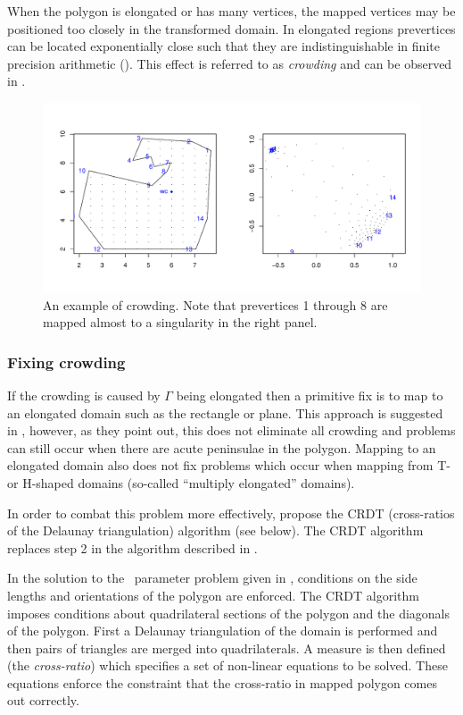 When the polygon is elongated or has many vertices, the mapped vertices may be positioned too closely in the transformed domain. In elongated regions prevertices can be located exponentially close such that they are indistinguishable in finite precision arithmetic (\cite{howell90}). This effect is referred to as \emph{crowding} and can be observed in . 

\begin{figure} [tbp]
\centering
\includegraphics[scale=0.5]{sc/figs/crowdeddisk.pdf}
\caption{An example of crowding. Note that prevertices 1 through 8 are mapped almost to a singularity in the right panel.}
\label{crowdeddisk}
\end{figure}

\subsubsection{Fixing crowding}
\label{sc-crdt}

If the crowding is caused by $\Gamma$ being elongated then a  primitive fix is to map to an elongated domain such as the rectangle or plane. This approach is suggested in , however, as they point out, this does not eliminate all crowding and problems can still occur when there are acute peninsulae in the polygon. Mapping to an elongated domain also does not fix problems which occur when mapping from T- or H-shaped domains (so-called ``multiply elongated'' domains).

In order to combat this problem more effectively,  propose the CRDT (cross-ratios of the Delaunay triangulation) algorithm (see below). The CRDT algorithm replaces step 2 in the algorithm described in . 

In the solution to the \sch\ parameter problem given in , conditions on the side lengths and orientations of the polygon are enforced. The CRDT algorithm imposes conditions about quadrilateral sections of the polygon and the diagonals of the polygon. First a Delaunay triangulation of the domain is performed and then pairs of triangles are merged into quadrilaterals. A measure is then defined (the \emph{cross-ratio}) which specifies a set of non-linear equations to be solved. These equations enforce the constraint that the cross-ratio in mapped polygon comes out correctly. 

